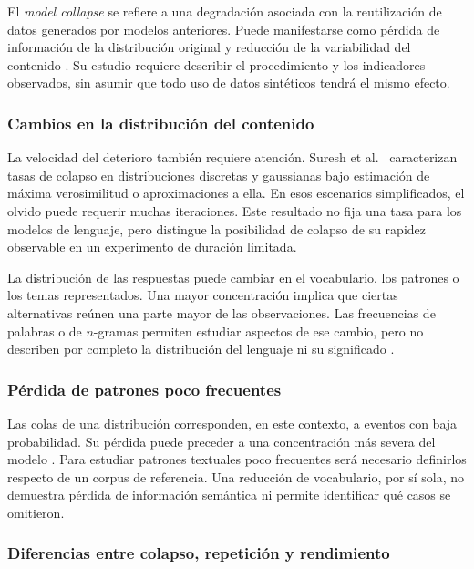 \documentclass[12pt,letterpaper]{article}
\begin{document}
El \textit{model collapse} se refiere a una degradación asociada con la
reutilización de datos generados por modelos anteriores. Puede manifestarse
como pérdida de información de la distribución original y reducción de
la variabilidad del contenido \cite{shumailov2024}. Su estudio requiere
describir el procedimiento y los indicadores observados, sin asumir que
todo uso de datos sintéticos tendrá el mismo efecto.

\subsubsection{Cambios en la distribución del contenido}

La velocidad del deterioro también requiere atención. Suresh et al.\
\cite{suresh2025} caracterizan tasas de colapso en distribuciones discretas
y gaussianas bajo estimación de máxima verosimilitud o aproximaciones a ella.
En esos escenarios simplificados, el olvido puede requerir muchas
iteraciones. Este resultado no fija una tasa para los modelos de lenguaje,
pero distingue la posibilidad de colapso de su rapidez observable en un
experimento de duración limitada.

La distribución de las respuestas puede cambiar en el vocabulario, los
patrones o los temas representados. Una mayor concentración implica que
ciertas alternativas reúnen una parte mayor de las observaciones. Las
frecuencias de palabras o de \(n\)-gramas permiten estudiar aspectos de ese
cambio, pero no describen por completo la distribución del lenguaje ni
su significado \cite{zhu2025}.

\subsubsection{Pérdida de patrones poco frecuentes}

Las colas de una distribución corresponden, en este contexto, a eventos
con baja probabilidad. Su pérdida puede preceder a una concentración más
severa del modelo \cite{shumailov2024}. Para estudiar patrones textuales
poco frecuentes será necesario definirlos respecto de un corpus de
referencia. Una reducción de vocabulario, por sí sola, no demuestra pérdida
de información semántica ni permite identificar qué casos se omitieron.

\subsubsection{Diferencias entre colapso, repetición y rendimiento}
\end{document}
